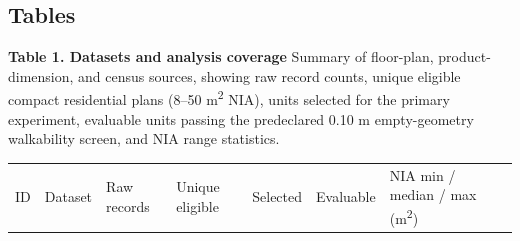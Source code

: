 \documentclass[12pt,letterpaper]{article}
\begin{document}
\clearpage\begin{landscape}\small

\section{Tables}\label{tables}

\textbf{Table 1. Datasets and analysis coverage} Summary of floor-plan, product-dimension, and census sources, showing raw record counts, unique eligible compact residential plans (8--50 m\textsuperscript{2} NIA), units selected for the primary experiment, evaluable units passing the predeclared 0.10 m empty-geometry walkability screen, and NIA range statistics.

{\def\LTcaptype{none} %
\begin{longtable}[]{@{}
  >{\raggedright\arraybackslash}p{}
  >{\raggedright\arraybackslash}p{}
  >{\raggedleft\arraybackslash}p{}
  >{\raggedleft\arraybackslash}p{}
  >{\raggedleft\arraybackslash}p{}
  >{\raggedleft\arraybackslash}p{}
  >{\raggedright\arraybackslash}p{}
  >{\raggedright\arraybackslash}p{}@{}}
\toprule\noalign{}
\begin{minipage}[b]{\linewidth}\raggedright
ID
\end{minipage} & \begin{minipage}[b]{\linewidth}\raggedright
Dataset
\end{minipage} & \begin{minipage}[b]{\linewidth}\raggedleft
Raw records
\end{minipage} & \begin{minipage}[b]{\linewidth}\raggedleft
Unique eligible
\end{minipage} & \begin{minipage}[b]{\linewidth}\raggedleft
Selected
\end{minipage} & \begin{minipage}[b]{\linewidth}\raggedleft
Evaluable
\end{minipage} & \begin{minipage}[b]{\linewidth}\raggedright
NIA min / median / max (m\textsuperscript{2})
\end{minipage} & \begin{minipage}[b]{\linewidth}\raggedright

\end{minipage}
\end{longtable}}
\end{landscape}
\end{document}
